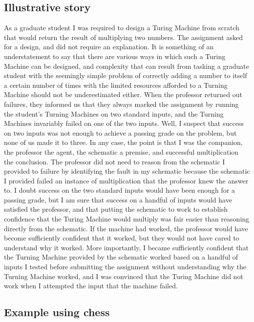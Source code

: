 \documentclass[10pt]{article}
\begin{document}
\subsection{Illustrative story}
\label{sec:illustrative-story}

As a graduate student I was required to design a Turing Machine from scratch that would return the result of multiplying two numbers.
The assignment asked for a design, and did not require an explanation.
It is something of an understatement to say that there are various ways in which such a Turing Machine can be designed, and complexity that can result from tasking a graduate student with the seemingly simple problem of correctly adding a number to itself a certain number of times with the limited resources afforded to a Turning Machine should not be underestimated either.
When the professor returned out failures, they informed us that they always marked the assignment by running the student's Turning Machines on two standard inputs, and the Turning Machines invariably failed on one of the two inputs.
Well, I suspect that success on two inputs was not enough to achieve a passing grade on the problem, but none of us made it to three.
In any case, the point is that I was the companion, the professor the agent, the schematic a premise, and successful multiplication the conclusion.
The professor did not need to reason from the schematic I provided to failure by identifying the fault in my schematic because the schematic I provided failed an instance of multiplication that the professor knew the answer to.
I doubt success on the two standard inputs would have been enough for a passing grade, but I am sure that success on a handful of inputs would have satisfied the professor, and that putting the schematic to work to establish confidence that the Turing Machine would multiply was fair easier than reasoning directly from the schematic.
If the machine had worked, the professor would have become sufficiently confident that it worked, but they would not have cared to understand why it worked.
More importantly, I became sufficiently confident that the Turning Machine provided by the schematic worked based on a handful of inputs I tested before submitting the assignment without understanding why the Turning Machine worked, and I was convinced that the Turing Machine did not work when I attempted the input that the machine failed.


\subsection{Example using chess}
\label{sec:example-using-chess}
\end{document}
